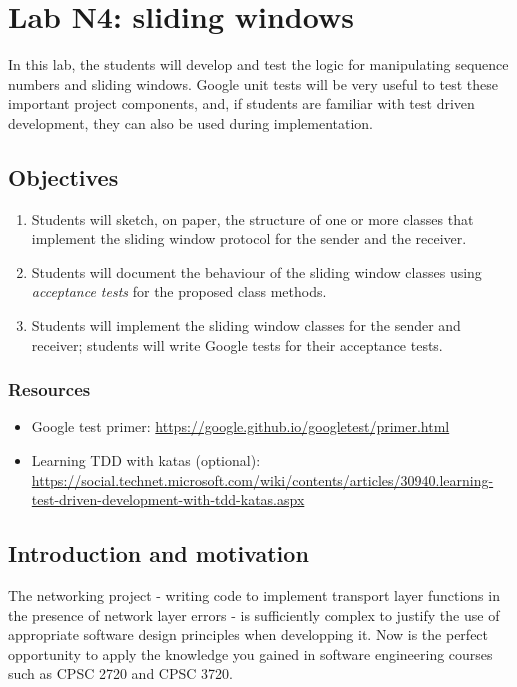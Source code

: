 \documentclass[12pt]{book}
\begin{document}
\chapter{Lab N4: sliding windows}

In this lab, the students will develop and test the logic for manipulating sequence numbers and sliding windows. Google unit tests will be very useful to test these important project components, and, if students are familiar with test driven development, they can also be used during implementation.

\section{Objectives}

\begin{enumerate}[label=Objective \arabic*]
\item\label{pl3.abs} Students will sketch, on paper, the structure of one or more classes that implement the sliding window protocol for the sender and the receiver.
\item\label{pl3.test} Students will document the behaviour of the sliding window classes using \emph{acceptance tests} for the proposed class methods.
  \item\label{pl3.impl} Students will implement the sliding window classes for the sender and receiver; students will write Google tests for their acceptance tests.
\end{enumerate}

\subsection{Resources}

\begin{itemize}[label=--]
\item Google test primer: \url{https://google.github.io/googletest/primer.html}
\item Learning TDD with katas (optional): \url{https://social.technet.microsoft.com/wiki/contents/articles/30940.learning-test-driven-development-with-tdd-katas.aspx}
\end{itemize}


\section{Introduction and motivation}


The networking project - writing code to implement transport layer functions in the presence of network layer errors - is sufficiently complex to justify the use of appropriate software design principles when developping it. Now is the perfect opportunity to apply the knowledge you gained in software engineering courses such as CPSC 2720 and CPSC 3720.
\end{document}

